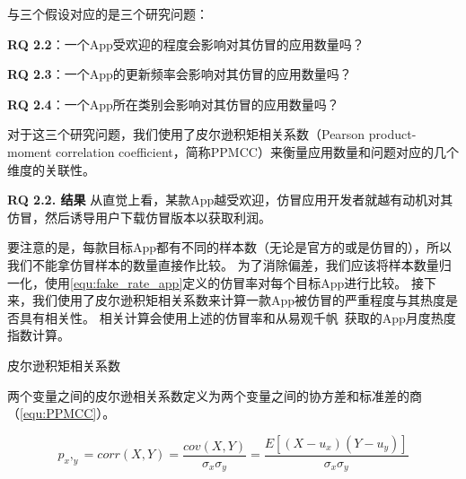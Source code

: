 与三个假设对应的是三个研究问题：

{\bf RQ 2.2}：一个App受欢迎的程度会影响对其仿冒的应用数量吗？

{\bf RQ 2.3}：一个App的更新频率会影响对其仿冒的应用数量吗？

{\bf RQ 2.4}：一个App所在类别会影响对其仿冒的应用数量吗？

对于这三个研究问题，我们使用了皮尔逊积矩相关系数（Pearson product-moment correlation coefficient，简称PPMCC）来衡量应用数量和问题对应的几个维度的关联性。

{\bf RQ 2.2. 结果}
从直觉上看，某款App越受欢迎，仿冒应用开发者就越有动机对其仿冒，然后诱导用户下载仿冒版本以获取利润。

要注意的是，每款目标App都有不同的样本数（无论是官方的或是仿冒的），所以我们不能拿仿冒样本的数量直接作比较。
为了消除偏差，我们应该将样本数量归一化，使用\autoref{equ:fake_rate_app}定义的仿冒率对每个目标App进行比较。
接下来，我们使用了皮尔逊积矩相关系数来计算一款App被仿冒的严重程度与其热度是否具有相关性。
相关计算会使用上述的仿冒率和从易观千帆~\cite{yiguanqianfan}获取的App月度热度指数计算。

\begin{Def}
    皮尔逊积矩相关系数

    两个变量之间的皮尔逊相关系数定义为两个变量之间的协方差和标准差的商（\autoref{equ:PPMCC}）。
\end{Def}
\begin{equation}
    p_x,_y = corr(X,Y)=\frac{cov(X,Y)}{\sigma_x\sigma_y}=\frac{E[(X-u_x)(Y-u_y)]}{\sigma_x\sigma_y}
    \label{equ:PPMCC}
\end{equation}
\vspace{0.5mm}

